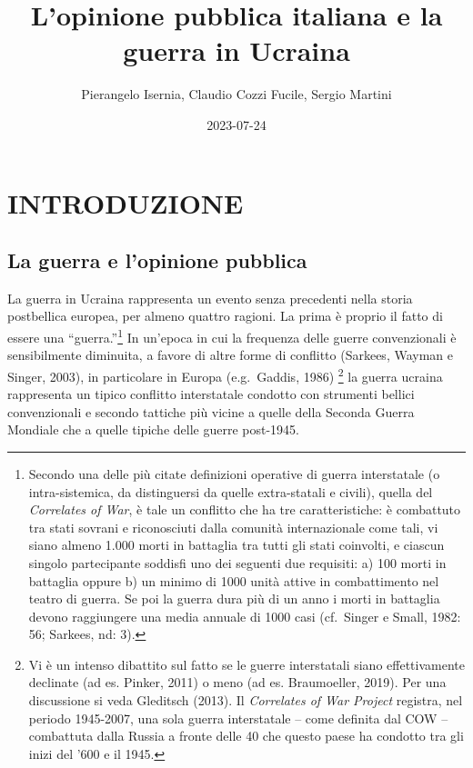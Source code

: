 \documentclass[
]{book}
\title{L'opinione pubblica italiana e la guerra in Ucraina}
\author{Pierangelo Isernia, Claudio Cozzi Fucile, Sergio Martini}
\date{2023-07-24}
\begin{document}
\maketitle

{
\setcounter{tocdepth}{1}
\tableofcontents
}
\hypertarget{introduzione}{%
\chapter{INTRODUZIONE}\label{introduzione}}

\hypertarget{la-guerra-e-lopinione-pubblica}{%
\section{La guerra e l'opinione pubblica}\label{la-guerra-e-lopinione-pubblica}}

La guerra in Ucraina rappresenta un evento senza precedenti nella storia postbellica europea, per almeno quattro ragioni. La prima è proprio il fatto di essere una ``guerra.''\footnote{Secondo una delle più citate definizioni operative di guerra interstatale (o intra-sistemica, da distinguersi da quelle extra-statali e civili), quella del \emph{Correlates of War}, è tale un conflitto che ha tre caratteristiche: è combattuto tra stati sovrani e riconosciuti dalla comunità internazionale come tali, vi siano almeno 1.000 morti in battaglia tra tutti gli stati coinvolti, e ciascun singolo partecipante soddisfi uno dei seguenti due requisiti: a) 100 morti in battaglia oppure b) un minimo di 1000 unità attive in combattimento nel teatro di guerra. Se poi la guerra dura più di un anno i morti in battaglia devono raggiungere una media annuale di 1000 casi (cf.~Singer e Small, 1982: 56; Sarkees, nd: 3).} In un'epoca in cui la frequenza delle guerre convenzionali è sensibilmente diminuita, a favore di altre forme di conflitto (Sarkees, Wayman e Singer, 2003), in particolare in Europa (e.g.~Gaddis, 1986) \footnote{Vi è un intenso dibattito sul fatto se le guerre interstatali siano effettivamente declinate (ad es. Pinker, 2011) o meno (ad es. Braumoeller, 2019). Per una discussione si veda Gleditsch (2013). Il \emph{Correlates of War Project} registra, nel periodo 1945-2007, una sola guerra interstatale -- come definita dal COW -- combattuta dalla Russia a fronte delle 40 che questo paese ha condotto tra gli inizi del '600 e il 1945.} la guerra ucraina rappresenta un tipico conflitto interstatale condotto con strumenti bellici convenzionali e secondo tattiche più vicine a quelle della Seconda Guerra Mondiale che a quelle tipiche delle guerre post-1945.
\end{document}
